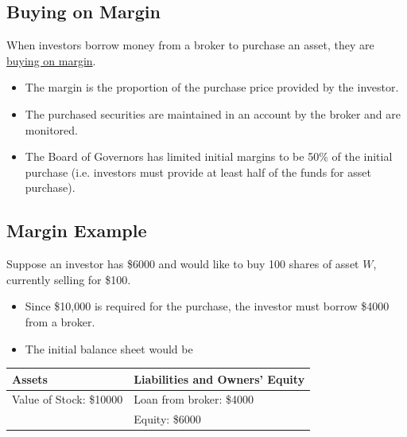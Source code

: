 \documentclass[letterpaper,10pt,english]{sphinxmanual}
\begin{document}
\subsection{Buying on Margin}
\label{trading:buying-on-margin}
When investors borrow money from a broker to purchase an asset, they
are \href{http://bit.ly/1aJfOKG}{buying on margin}.
\begin{itemize}
\item {} 
The margin is the proportion of the purchase price provided by the
investor.

\end{itemize}
\begin{itemize}
\item {} 
The purchased securities are maintained in an account by the broker
and are monitored.

\end{itemize}
\begin{itemize}
\item {} 
The Board of Governors has limited initial margins to be 50\% of the
initial purchase (i.e. investors must provide at least half of the
funds for asset purchase).

\end{itemize}


\subsection{Margin Example}
\label{trading:margin-example}
Suppose an investor has \$6000 and would like to buy 100 shares of
asset $W$, currently selling for \$100.
\begin{itemize}
\item {} 
Since \$10,000 is required for the purchase, the investor must
borrow \$4000 from a broker.

\end{itemize}
\begin{itemize}
\item {} 
The initial balance sheet would be

\end{itemize}

\begin{tabulary}{\linewidth}{|L|L|}
\hline
\textsf{\relax 
Assets
} & \textsf{\relax 
Liabilities and Owners' Equity
}\\
\hline
Value of Stock: \$10000
 & 
Loan from broker: \$4000
\\


 & 
Equity: \$6000
\\
\hline\end{tabulary}
\end{document}
